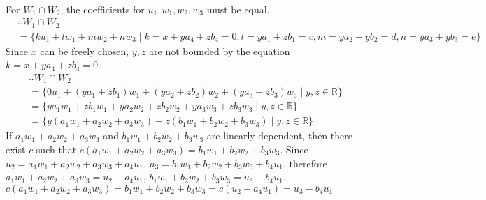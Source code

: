 \documentclass[10pt]{article}
\begin{document}
{{\begin{align}
		\end{align}
		For $W_1 \cap W_2$, the coefficients for $u_1, w_1, w_2, w_3$ must be equal.
		\begin{align}
			&\therefore W_1 \cap W_2  \\
			&= \{ku_1 + lw_1 + mw_2 + nw_3 \mid k = x + ya_4 + zb_4 = 0, l = ya_1 + zb_1 = c, m = ya_2 + yb_2 = d, n = ya_3 + yb_3 = e\}
		\end{align}
		Since $x$ can be freely chosen, $y, z$ are not bounded by the equation $k = x + ya_4 + zb_4 = 0$.
		\begin{align}
			&\therefore W_1 \cap W_2 \\
			&= \{0u_1 + (ya_1 + zb_1)w_1 + (ya_2 + zb_2)w_2 + (ya_3 + zb_3)w_3 \mid y, z \in \mathbb{R}\} \\
			&= \{ya_1w_1 + zb_1w_1 + ya_2w_2 + zb_2w_2 + ya_3w_3 + zb_3w_3 \mid y, z \in \mathbb{R}\} \\
			&= \{y(a_1w_1 + a_2w_2 + a_3w_3) + z(b_1w_1 + b_2w_2 + b_3w_3) \mid y, z \in \mathbb{R}\}
		\end{align}
		If $a_1w_1 + a_2w_2 + a_3w_3$ and $b_1w_1 + b_2w_2 + b_3w_3$ are linearly 
		dependent, then there exist $c$ such that $c(a_1w_1 + a_2w_2 + a_3w_3) = 
		b_1w_1 + b_2w_2 + b_3w_3$. Since $u_2 = a_1w_1 + a_2w_2 + a_3w_3 + a_4u_1$, 
		$u_3 = b_1w_1 + b_2w_2 + b_3w_3 + b_4u_1$, 
		therefore $a_1w_1 + a_2w_2 + a_3w_3 = u_2 - a_4u_1$, $b_1w_1 + b_2w_2 + b_3w_3 = u_3 - b_4u_1$.
		$c(a_1w_1 + a_2w_2 + a_3w_3) = b_1w_1 + b_2w_2 + b_3w_3 = c(u_2 - a_4u_1) = u_3 - b_4u_1$
	}
}
\end{document}
